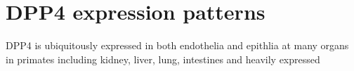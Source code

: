 \section{DPP4 expression patterns}
DPP4 is ubiquitously expressed in both endothelia and epithlia at many organs in primates including kidney, liver, lung, intestines and heavily expressed 
